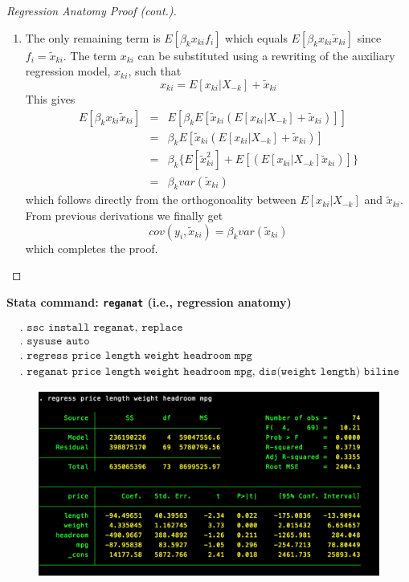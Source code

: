 \documentclass[notes=show]{beamer}
\begin{document}
\begin{frame}[plain, shrink=25]

	\begin{proof}[Regression Anatomy Proof (cont.)]
		\begin{enumerate}\addtocounter{enumi}{3}
		\item The only remaining term is $E[\beta_kx_{ki}f_i]$ which equals $E[\beta_kx_{ki}\tilde{x}_{ki}]$ since $f_i=\tilde{x}_{ki}$. The term $x_{ki}$ can be substituted using a rewriting of the auxiliary regression model, $x_{ki}$, such that$$x_{ki} = E[x_{ki} | X_{-k}] + \tilde{x}_{ki}$$This gives
			\begin{eqnarray*}
			E[\beta_kx_{ki}\tilde{x}_{ki}] &=& E[\beta_kE[\tilde{x}_{ki}(E[x_{ki}|X_{-k}]+\tilde{x}_{ki})]] \\
			&=& \beta_kE[\tilde{x}_{ki}(E[x_{ki}|X_{-k}]+\tilde{x}_{ki})] \\
			&=&\beta_k\{E[\tilde{x}^2_{ki}] + E[(E[x_{ki}|X_{-k}]\tilde{x}_{ki})]\} \\
			&=& \beta_k var(\tilde{x}_{ki})
			\end{eqnarray*}which follows directly from the orthogonoality between $E[x_{ki} | X_{-k}]$ and $\tilde{x}_{ki}$. From previous derivations we finally get$$cov(y_i,\tilde{x}_{ki}) = \beta_kvar(\tilde{x}_{ki})$$which completes the proof. \qedhere
		\end{enumerate}
	\end{proof}

\end{frame}




\begin{frame}[plain, shrink=20]
	\begin{center}
	\textbf{Stata command: \texttt{reganat} (i.e., regression anatomy)}
	\end{center}
	
			\begin{align*}
			&.\texttt{ ssc install reganat, replace}& \\
			&.\texttt{ sysuse auto} \\
			&.\texttt{ regress price length weight headroom mpg} \\
			&.\texttt{ reganat price length weight headroom mpg, dis(weight length) biline}
			\end{align*}	
	\begin{figure}[h]
	\includegraphics[scale=0.3]{./lecture_includes/reganat_1.png}
	\end{figure}
\end{frame}		
\end{document}
